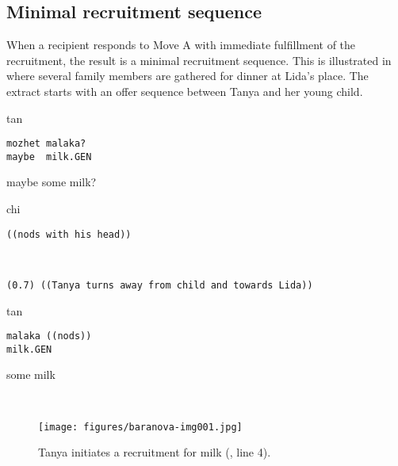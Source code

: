 \documentclass[output=paper,modfonts,nonflat]{langsci/langscibook}
\begin{document}
\subsection{Minimal recruitment sequence}

When a recipient responds to Move A with immediate fulfillment of the recruitment, the result is a minimal recruitment sequence. This is illustrated in  where several family members are gathered for dinner at Lida’s place. The extract starts with an offer sequence between Tanya and her young child.

\vspace{2mm}
%
\begin{transbox}{1}{tan}
\begin{verbatim}
mozhet malaka?
maybe  milk.GEN
\end{verbatim}
maybe some milk?
\end{transbox}
%
\begin{transbox}{2}{chi}
\begin{verbatim}
((nods with his head))
\end{verbatim}
\end{transbox}
%
\begin{transbox}{3}{~}
\begin{verbatim}
(0.7) ((Tanya turns away from child and towards Lida))
\end{verbatim}
\end{transbox}
%
\begin{mdframednoverticalspace}[style=firstfoc]
\begin{transbox}{4}{tan}
\begin{verbatim}
malaka ((nods))
milk.GEN
\end{verbatim}
some milk %
\end{transbox}
\end{mdframednoverticalspace}
%
\begin{mdframednoverticalspace}[style=secondfoc]
\end{mdframednoverticalspace}\\

\begin{figure}
\caption{Tanya initiates a recruitment for milk (, line 4).}
\label{fig:baranova:1}
\texttt{[image: figures/baranova-img001.jpg]}
\end{figure}
\end{document}
